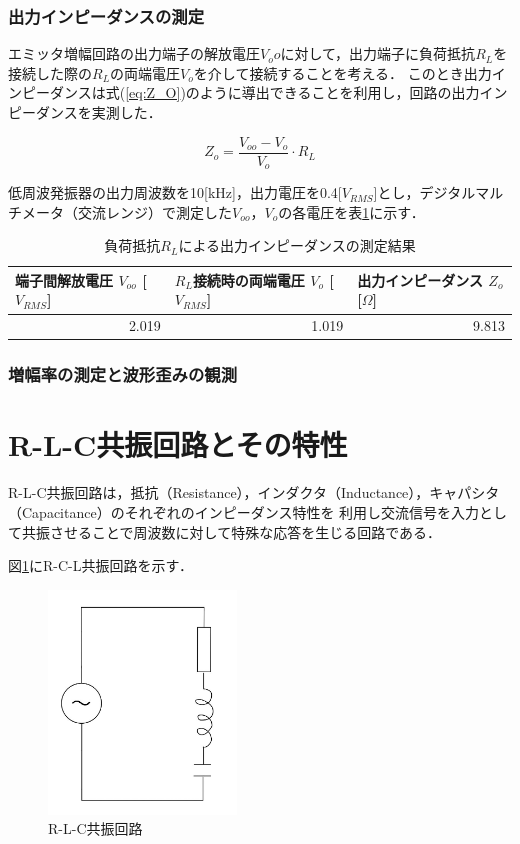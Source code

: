 \documentclass[dvipdfmx,titlepage,a4j]{jsarticle}  %
\numberwithin{equation}{section}
\begin{document}
\subsubsection{出力インピーダンスの測定}
エミッタ増幅回路の出力端子の解放電圧$V_oo$に対して，出力端子に負荷抵抗$R_L$を接続した際の$R_L$の両端電圧$V_o$を介して接続することを考える．
このとき出力インピーダンスは式(\ref{eq:Z_O})のように導出できることを利用し，回路の出力インピーダンスを実測した．

\begin{equation}
  Z_o = \frac{V_{oo} - V_o}{V_o} \cdot R_L
  \label{eq:Z_O}
\end{equation}

低周波発振器の出力周波数を10[kHz]，出力電圧を0.4[$V_{RMS}$]とし，デジタルマルチメータ（交流レンジ）で測定した$V_{oo}$，$V_o$の各電圧を表\ref{tbl:res;Z_O}に示す．

\begin{table}[H]
  \caption{負荷抵抗$R_L$による出力インピーダンスの測定結果}
  \begin{center}
    \begin{tabular}{l|l|l}
      \hline
      端子間解放電圧 $V_{oo}$ [$V_{RMS}$] & $R_L$接続時の両端電圧 $V_o$ [$V_{RMS}$] & 出力インピーダンス $Z_o$ [$\Omega$] \\ \hline\hline
      \multicolumn{1}{r|}{2.019}          & \multicolumn{1}{r|}{1.019}              & \multicolumn{1}{r}{9.813}           \\ \hline
    \end{tabular}
  \end{center}
  \label{tbl:res;Z_O}
\end{table}

\subsubsection{増幅率の測定と波形歪みの観測}

\section{R-L-C共振回路とその特性}
R-L-C共振回路は，抵抗（Resistance），インダクタ（Inductance），キャパシタ（Capacitance）のそれぞれのインピーダンス特性を
利用し交流信号を入力として共振させることで周波数に対して特殊な応答を生じる回路である．

図\ref{fig:fig6-rcl.jpg}にR-C-L共振回路を示す．
\begin{figure}[H]
  \centering
  \includegraphics[width=5cm]{../fig/fig6-rcl.jpg}
  \caption{R-L-C共振回路}
  \label{fig:fig6-rcl.jpg}
\end{figure}
\end{document}
